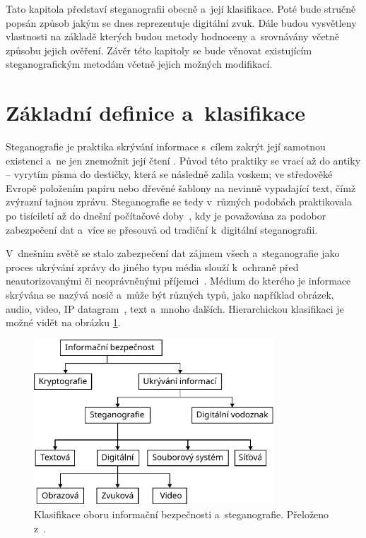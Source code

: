 Tato kapitola představí steganografii obecně a~její klasifikace. Poté bude
stručně popsán způsob jakým se dnes reprezentuje digitální zvuk. Dále budou
vysvětleny vlastnosti na základě kterých budou metody hodnoceny a~srovnávány
včetně způsobu jejich ověření. Závěr této kapitoly se bude věnovat existujícím
steganografickým metodám včetně jejich možných modifikací.

\section{Základní definice a~klasifikace}
\label{sec:definitions}

Steganografie je praktika skrývání informace s~cílem zakrýt její samotnou
existenci a~ne jen znemožnit její čtení
\cite{AlSabhany2020}\cite{Anderson1998}\cite{Djebbar2012}\cite{Dutta2020}.
Původ této praktiky se vrací až do antiky -- vyrytím písma do destičky, která
se následně zalila voskem; ve středověké Evropě položením papíru nebo dřevěné
šablony na nevinně vypadající text, čímž zvýrazní tajnou zprávu. Steganografie
se tedy v~různých podobách praktikovala po tisíciletí až do dnešní počítačové
doby~\cite{Anderson1998}, kdy je považována za podobor zabezpečení dat
\cite{Djebbar2012} a~více se přesouvá od tradiční k~digitální steganografii.

V~dnešním světě se stalo zabezpečení dat zájmem všech a~steganografie jako
proces ukrývání zprávy do jiného typu média slouží k~ochraně před
neautorizovanými či neoprávněnými příjemci~\cite{Dutta2020}. Médium do kterého
je informace skrývána se nazývá nosič a~může být různých typů, jako například
obrázek, audio, video, IP datagram~\cite{Dutta2020}, text a~mnoho dalších.
Hierarchickou klasifikaci je možné vidět na obrázku
\ref{pic:steganography-classification}.

\begin{figure}[hbt]
    \centering
    \includegraphics[width=0.8\textwidth]{obrazky/steganography-classification.pdf}
    \caption{Klasifikace oboru informační bezpečnosti a~steganografie.
    Přeloženo z~\cite{Elshoush2022}.}
    \label{pic:steganography-classification}
\end{figure}

